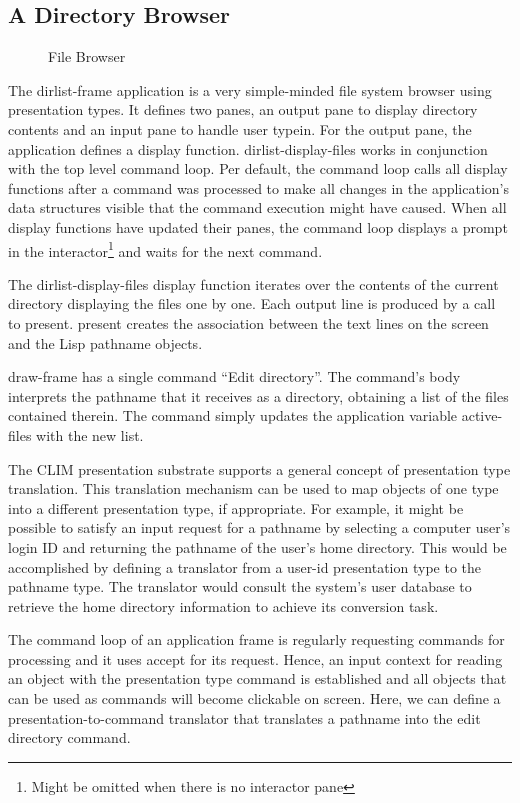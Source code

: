 \documentclass[twocolumn,a4paper]{article}
\newcommand {\code}[1]{{\sffamily #1}}
\newcommand {\CLIM}{{\small CLIM}}
\let\class\code
\let\method\code
\let\variable\code
\begin{document}
\subsection{A Directory Browser}
\begin{figure*}
\lstset{style=framestyle}

\caption{File Browser}\label{fig-file-browser}
\end{figure*}

The \class{dirlist-frame} application is a very simple-minded file system browser using presentation types.
It defines two panes, an output pane to display directory contents and an input pane to handle user typein.  For the output pane, the application defines a display function. \code{dirlist-display-files} works in conjunction with the top level command loop. Per default, the command loop calls all display functions after a command was processed to make all changes in the application's data structures visible that the command execution might have caused. When all display functions have updated their panes, the command loop displays a prompt in the interactor\footnote{Might be omitted when there is no interactor pane} and waits for the next command.

The \method{dirlist-display-files} display function iterates over the contents of the current directory displaying the files one by one.  Each output line is produced by a call to \method{present}. \method{present} creates the association between the text lines on the screen and the Lisp pathname objects.

\class{draw-frame} has a single command ``Edit directory''. The command's body interprets the pathname that it receives as a directory, obtaining a list of the files contained therein. The command simply updates the application variable \variable{active-files} with the new list.

The \CLIM{} presentation substrate supports a general concept of presentation type translation. This translation mechanism can be used to map objects of one type into a different presentation type, if appropriate. For example, it might be possible to satisfy an input request for a pathname by selecting a computer user's login ID and returning the pathname of the user's home directory. This would be accomplished by defining a translator from a user-id presentation type to the pathname type. The translator would consult the system's user database to retrieve the home directory information to achieve its conversion task.

The command loop of an application frame is regularly requesting commands for processing and it uses \method{accept} for its request. Hence, an input context for reading an object with the presentation type \class{command} is established and all objects that can be used as commands will become clickable on screen. Here, we can define a presentation-to-command translator that translates a pathname into the edit directory command.
\end{document}
